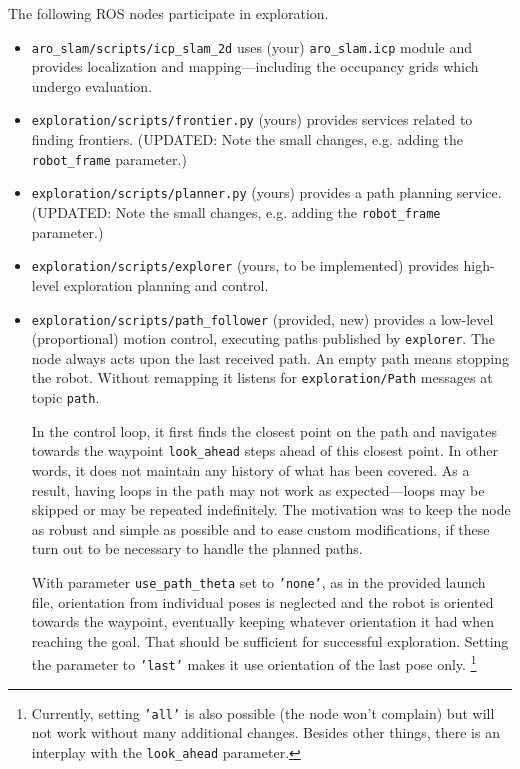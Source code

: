 \documentclass[a4paper]{article}
\newcommand{\python}[1]{\texttt{#1}}
\newcommand{\file}[1]{\texttt{#1}}
\begin{document}
The following ROS nodes participate in exploration.
\begin{itemize}\itemsep0em
\item \file{aro_slam/scripts/icp_slam_2d} uses (your) \file{aro_slam.icp} module and provides localization and mapping---including the occupancy grids which undergo evaluation.
\item \file{exploration/scripts/frontier.py} (yours) provides services related to finding frontiers. (UPDATED: Note the small changes, e.g. adding the \python{robot_frame} parameter.)
\item \file{exploration/scripts/planner.py} (yours) provides a path planning service. (UPDATED: Note the small changes, e.g. adding the \python{robot_frame} parameter.)
\item \file{exploration/scripts/explorer} (yours, to be implemented) provides high-level exploration planning and control.
\item \file{exploration/scripts/path_follower} (provided, new) provides a low-level (proportional) motion control, executing paths published by \file{explorer}.
The node always acts upon the last received path.
An empty path means stopping the robot.
Without remapping it listens for \file{exploration}\allowbreak\file{/}\allowbreak\file{Path} messages at topic \file{path}.

In the control loop, it first finds the closest point on the path and navigates towards the waypoint \python{look_ahead} steps ahead of this closest point.
In other words, it does not maintain any history of what has been covered.
As a result, having loops in the path may not work as expected---loops may be skipped or may be repeated indefinitely.
The motivation was to keep the node as robust and simple as possible and to ease custom modifications, if these turn out to be necessary to handle the planned paths.

With parameter \python{use_path_theta} set to \python{'none'}, as in the provided launch file, orientation from individual poses is neglected and the robot is oriented towards the waypoint, eventually keeping whatever orientation it had when reaching the goal.
That should be sufficient for successful exploration.
Setting the parameter to \python{'last'} makes it use orientation of the last pose only.%
\footnote{Currently, setting \python{'all'} is also possible (the node won't complain) but will not work without many additional changes.
Besides other things, there is an interplay with the \python{look_ahead} parameter.}
\end{itemize}
\end{document}
